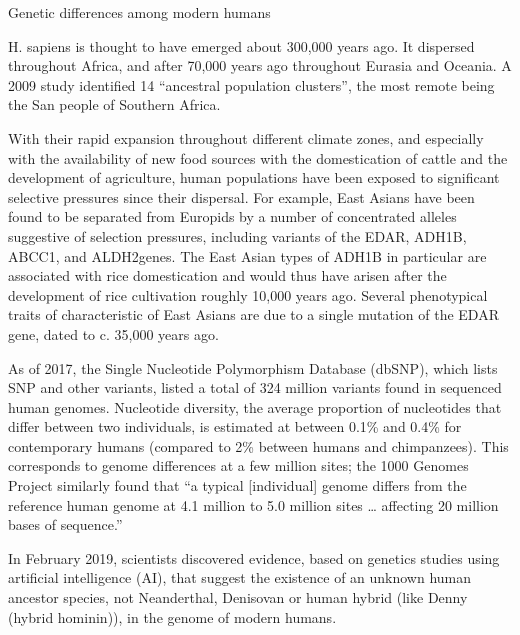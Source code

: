 Genetic differences among modern humans

H. sapiens is thought to have emerged about 300,000 years ago. It dispersed throughout Africa, and after 70,000 years ago throughout Eurasia and Oceania. A 2009 study identified 14 ``ancestral population clusters'', the most remote being the San people of Southern Africa.

With their rapid expansion throughout different climate zones, and especially with the availability of new food sources with the domestication of cattle and the development of agriculture, human populations have been exposed to significant selective pressures since their dispersal. For example, East Asians have been found to be separated from Europids by a number of concentrated alleles suggestive of selection pressures, including variants of the EDAR, ADH1B, ABCC1, and ALDH2genes. The East Asian types of ADH1B in particular are associated with rice domestication and would thus have arisen after the development of rice cultivation roughly 10,000 years ago. Several phenotypical traits of characteristic of East Asians are due to a single mutation of the EDAR gene, dated to c. 35,000 years ago.

As of 2017, the Single Nucleotide Polymorphism Database (dbSNP), which lists SNP and other variants, listed a total of 324 million variants found in sequenced human genomes. Nucleotide diversity, the average proportion of nucleotides that differ between two individuals, is estimated at between 0.1\% and 0.4\% for contemporary humans (compared to 2\% between humans and chimpanzees). This corresponds to genome differences at a few million sites; the 1000 Genomes Project similarly found that ``a typical {[}individual{]} genome differs from the reference human genome at 4.1 million to 5.0 million sites \ldots{} affecting 20 million bases of sequence.''

In February 2019, scientists discovered evidence, based on genetics studies using artificial intelligence (AI), that suggest the existence of an unknown human ancestor species, not Neanderthal, Denisovan or human hybrid (like Denny (hybrid hominin)), in the genome of modern humans.



